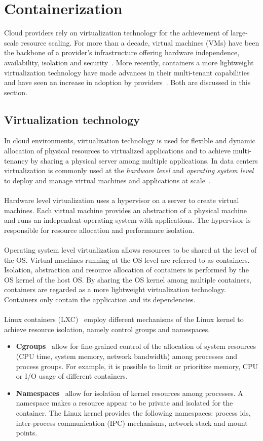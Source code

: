 \section{Containerization}
Cloud providers rely on virtualization technology for the achievement of large-scale resource scaling. For more than a decade, virtual machines (VMs) have been the backbone of a provider's infrastructure offering hardware independence, availability, isolation and security~\cite{xavier2013performance}. More recently, containers a more lightweight virtualization technology have made advances in their multi-tenant capabilities and have seen an increase in adoption by providers~\cite{pahl2015containerization}. Both are discussed in this section.
\subsection{Virtualization technology}
In cloud environments, virtualization technology is used for flexible and dynamic allocation of physical resources to virtualized applications and to achieve multi-tenancy by sharing a physical server among multiple applications. In data centers virtualization is commonly used at the \textit{hardware level} and \textit{operating system level} to deploy and manage virtual machines and applications at scale~\cite{SharmaPrateek2016CaVM}. \\\\
Hardware level virtualization uses a hypervisor on a server to create virtual machines. Each virtual machine provides an abstraction of a physical machine and runs an independent operating system with applications. The hypervisor is responsible for resource allocation and performance isolation.\\\\
Operating system level virtualization allows resources to be shared at the level of the OS. Virtual machines running at the OS level are referred to as containers. Isolation, abstraction and resource allocation of containers is performed by the OS kernel of the host OS. By sharing the OS kernel among multiple containers, containers are regarded as a more lightweight virtualization technology. Containers only contain the application and its dependencies.\\\\
Linux containers (LXC)~\cite{lxc} employ different mechanisms of the Linux kernel to achieve resource isolation, namely control groups and namespaces.
\begin{itemize}
    \item \textbf{Cgroups}~\cite{cgroups} allow for fine-grained control of the allocation of system resources (CPU time, system memory, network bandwidth) among processes and process groups. For example, it is possible to limit or prioritize memory, CPU or I/O usage of different containers. 
    \item \textbf{Namespaces}~\cite{namespaces} allow for isolation of kernel resources among processes. A namespace makes a resource appear to be private and isolated for the container. The Linux kernel provides the following namespaces:  process ids, inter-process communication (IPC) mechanisms, network stack and mount points.
\end{itemize}
